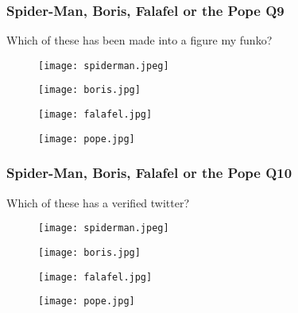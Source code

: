 \documentclass{beamer}
\begin{document}
\begin{frame}
\frametitle{Spider-Man, Boris, Falafel or the Pope Q9}
Which of these has been made into a figure my funko?
\begin{figure}[!htb]
    \centering
    \begin{minipage}{.5\textwidth}
        \centering
        \texttt{[image: spiderman.jpeg]}
        
    \end{minipage}%
    \begin{minipage}{0.5\textwidth}
        \centering
        \texttt{[image: boris.jpg]}
        
    \end{minipage}
\end{figure}
\begin{figure}[!htb]
    \centering
    \begin{minipage}{.5\textwidth}
        \centering
        \texttt{[image: falafel.jpg]}
        
    \end{minipage}%
    \begin{minipage}{0.5\textwidth}
        \centering
        \texttt{[image: pope.jpg]}
        
    \end{minipage}
\end{figure}
\end{frame}


\begin{frame}
\frametitle{Spider-Man, Boris, Falafel or the Pope Q10}
Which of these has a verified twitter?
\begin{figure}[!htb]
    \centering
    \begin{minipage}{.5\textwidth}
        \centering
        \texttt{[image: spiderman.jpeg]}
        
    \end{minipage}%
    \begin{minipage}{0.5\textwidth}
        \centering
        \texttt{[image: boris.jpg]}
        
    \end{minipage}
\end{figure}
\begin{figure}[!htb]
    \centering
    \begin{minipage}{.5\textwidth}
        \centering
        \texttt{[image: falafel.jpg]}
        
    \end{minipage}%
    \begin{minipage}{0.5\textwidth}
        \centering
        \texttt{[image: pope.jpg]}
        
    \end{minipage}
\end{figure}
\end{frame}
\end{document}
